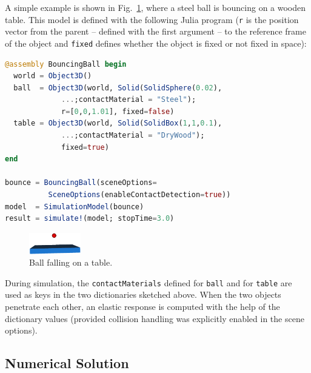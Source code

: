 A simple example is shown in Fig.~\ref{fig:bouncingBall}, where a
steel ball is bouncing on a wooden table.
This model is defined with the following Julia program
(\texttt{r} is the position vector from the parent -- defined with the first
argument -- to the reference frame of the object and \texttt{fixed} defines
whether the object is fixed or not fixed in space):
\newpage

\begin{lstlisting}[language = Julia]
@assembly BouncingBall begin
  world = Object3D()
  ball  = Object3D(world, Solid(SolidSphere(0.02),
		     ...;contactMaterial = "Steel");
		     r=[0,0,1.01], fixed=false)
  table = Object3D(world, Solid(SolidBox(1,1,0.1),
		     ...;contactMaterial = "DryWood"); 
		     fixed=true)
end

bounce = BouncingBall(sceneOptions=
          SceneOptions(enableContactDetection=true))
model  = SimulationModel(bounce)
result = simulate!(model; stopTime=3.0)
\end{lstlisting}


%
\begin{figure}[tb]
	\centering
	\includegraphics[width=0.2\textwidth]{figures/bouncingBall.png}
	\caption{Ball falling on a table.}
	\label{fig:bouncingBall}
\end{figure}
%
During simulation, the \texttt{contactMaterials} defined for
\texttt{ball} and for \texttt{table} are used as keys in the two
dictionaries sketched above. 
When the two objects penetrate each other,
an elastic response is computed with the help of the dictionary values 
(provided collision handling was explicitly enabled in the scene options).

\subsection{Numerical Solution}\label{sec:numericSolution}

\newcommand{\bvec}[1]{\bm{#1}}

